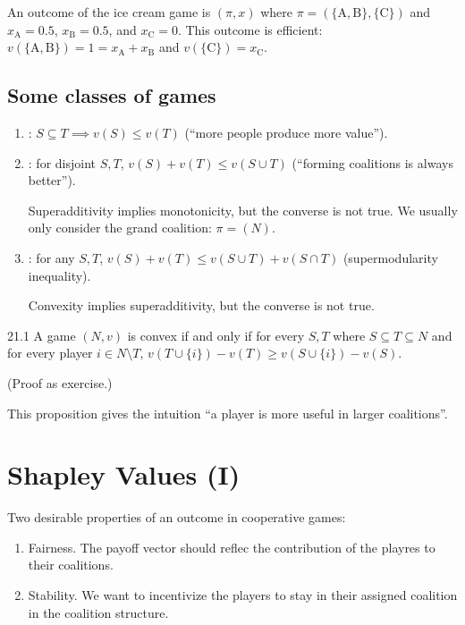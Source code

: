 \documentclass[12pt,letterpaper]{report}
\begin{document}
\begin{ex}
  An outcome of the ice cream game is $(\pi, x)$ where
  $\pi = (\{\text{A}, \text{B}\}, \{\text{C}\})$ and $x_\text{A} = 0.5$, $x_\text{B} = 0.5$, and
  $x_\text{C} = 0$.
  This outcome is efficient: $v(\{\text{A}, \text{B}\}) = 1 = x_\text{A} + x_\text{B}$ and
  $v(\{\text{C}\}) = x_\text{C}$.
\end{ex}

\pagebreak
\subsection{Some classes of games}

\begin{enumerate}
  \item
  : $S \subseteq T \implies v(S) \leq v(T)$ (``more people produce more
  value'').
  \item
  : for disjoint $S, T$, $v(S) + v(T) \leq v(S \cup T)$ (``forming
  coalitions is always better'').

  Superadditivity implies monotonicity, but the converse is not true.
  We usually only consider the grand coalition: $\pi = (N)$.
  \item
  : for any $S, T$, $v(S) + v(T) \leq v(S \cup T) + v(S \cap T)$
  (supermodularity inequality).

  Convexity implies superadditivity, but the converse is not true.
\end{enumerate}

\begin{prop}{}{21.1}
  A game $(N, v)$ is convex if and only if for every $S, T$ where $S \subseteq T \subseteq N$ and
  for every player $i \in N \setminus T$, $v(T \cup \{i\}) - v(T) \geq v(S \cup \{i\}) - v(S)$.
\end{prop}

(Proof as exercise.)

This proposition gives the intuition ``a player is more useful in larger coalitions''.

\section{Shapley Values (I)}

Two desirable properties of an outcome in cooperative games:
\begin{enumerate}
  \item
  Fairness.
  The payoff vector should reflec the contribution of the playres to their coalitions.
  \item
  Stability.
  We want to incentivize the players to stay in their assigned coalition in the coalition structure.
\end{enumerate}
\end{document}
